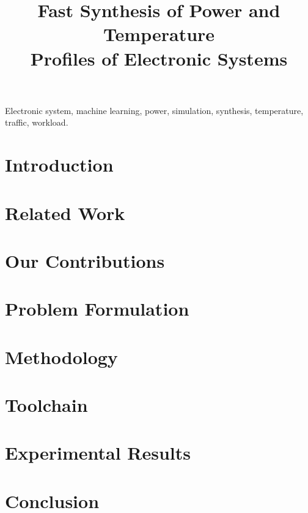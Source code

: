 \documentclass[conference]{IEEEtran}
\title{
  Fast Synthesis of Power and Temperature\\
  Profiles of Electronic Systems
  \vspace{-1.5em}
}
\author{}
\begin{document}
  \maketitle

  \begin{abstract}
    
  \end{abstract}

  \begin{IEEEkeywords}
    Electronic system,
    machine learning,
    power,
    simulation,
    synthesis,
    temperature,
    traffic,
    workload.
  \end{IEEEkeywords}


  \section{Introduction} 
  

  \section{Related Work}

  
  \section{Our Contributions} 
  

  \section{Problem Formulation} 
  

  \section{Methodology} 
  

  \section{Toolchain} 
  

  \section{Experimental Results} 
  

  \section{Conclusion} 
  

  \begingroup
    \linespread{0.9}
    
    
  \endgroup
\end{document}
